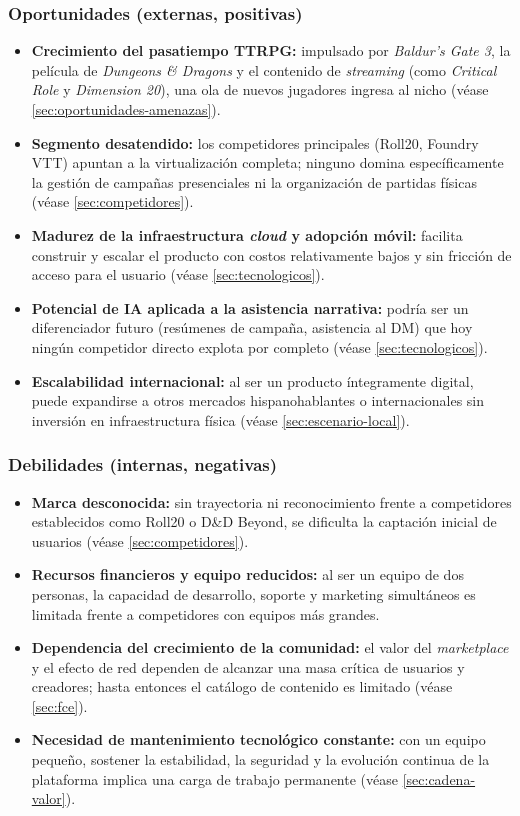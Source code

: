 \subsubsection{Oportunidades (externas, positivas)}
\begin{itemize}
  \item \textbf{Crecimiento del pasatiempo TTRPG:} impulsado por \textit{Baldur's Gate 3}, la película de \textit{Dungeons \& Dragons} y el contenido de \textit{streaming} (como \textit{Critical Role} y \textit{Dimension 20}), una ola de nuevos jugadores ingresa al nicho (véase \ref{sec:oportunidades-amenazas}).
  \item \textbf{Segmento desatendido:} los competidores principales (Roll20, Foundry VTT) apuntan a la virtualización completa; ninguno domina específicamente la gestión de campañas presenciales ni la organización de partidas físicas (véase \ref{sec:competidores}).
  \item \textbf{Madurez de la infraestructura \textit{cloud} y adopción móvil:} facilita construir y escalar el producto con costos relativamente bajos y sin fricción de acceso para el usuario (véase \ref{sec:tecnologicos}).
  \item \textbf{Potencial de IA aplicada a la asistencia narrativa:} podría ser un diferenciador futuro (resúmenes de campaña, asistencia al DM) que hoy ningún competidor directo explota por completo (véase \ref{sec:tecnologicos}).
  \item \textbf{Escalabilidad internacional:} al ser un producto íntegramente digital, puede expandirse a otros mercados hispanohablantes o internacionales sin inversión en infraestructura física (véase \ref{sec:escenario-local}).
\end{itemize}

\subsubsection{Debilidades (internas, negativas)}
\begin{itemize}
  \item \textbf{Marca desconocida:} sin trayectoria ni reconocimiento frente a competidores establecidos como Roll20 o D\&D Beyond, se dificulta la captación inicial de usuarios (véase \ref{sec:competidores}).
  \item \textbf{Recursos financieros y equipo reducidos:} al ser un equipo de dos personas, la capacidad de desarrollo, soporte y marketing simultáneos es limitada frente a competidores con equipos más grandes.
  \item \textbf{Dependencia del crecimiento de la comunidad:} el valor del \textit{marketplace} y el efecto de red dependen de alcanzar una masa crítica de usuarios y creadores; hasta entonces el catálogo de contenido es limitado (véase \ref{sec:fce}).
  \item \textbf{Necesidad de mantenimiento tecnológico constante:} con un equipo pequeño, sostener la estabilidad, la seguridad y la evolución continua de la plataforma implica una carga de trabajo permanente (véase \ref{sec:cadena-valor}).
\end{itemize}

